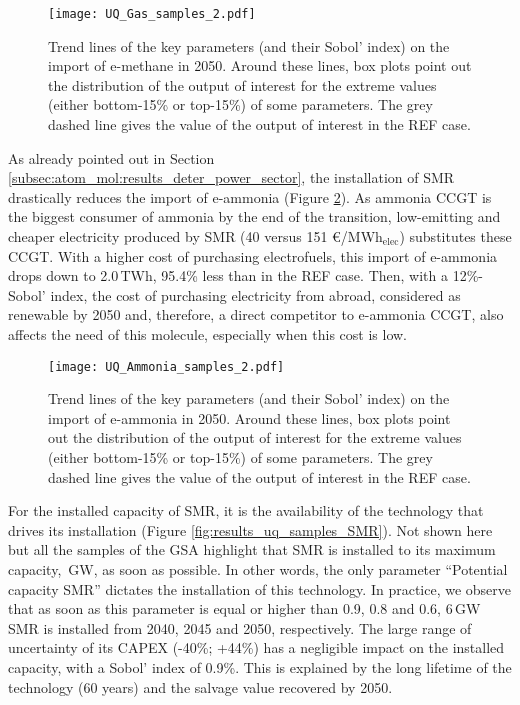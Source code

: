 \begin{figure}[htbp!]
\centering
\texttt{[image: UQ\_Gas\_samples\_2.pdf]}
\caption{Trend lines of the key parameters (and their Sobol' index) on the import of e-methane in 2050. Around these lines, box plots point out the distribution of the output of interest for the extreme values (either bottom-15\% or top-15\%) of some parameters. The grey dashed line gives the value of the output of interest in the REF case. }
\label{fig:results_uq_samples_gas}
\end{figure}

As already pointed out in Section \ref{subsec:atom_mol:results_deter_power_sector}, the installation of \gls{SMR} drastically reduces the import of e-ammonia (Figure \ref{fig:results_uq_samples_ammonia}). As ammonia \gls{CCGT} is the biggest consumer of ammonia by the end of the transition, low-emitting and cheaper electricity produced by \gls{SMR} (40 versus 151 €/MWh$_{\text{elec}}$) substitutes these \gls{CCGT}. With a higher cost of purchasing electrofuels, this import of e-ammonia drops down to 2.0\,TWh, 95.4\% less than in the REF case. Then, with a 12\%-Sobol' index, the cost of purchasing electricity from abroad, considered as renewable by 2050 and, therefore, a direct competitor to e-ammonia \gls{CCGT}, also affects the need of this molecule, especially when this cost is low.

\begin{figure}[htbp!]
\centering
\texttt{[image: UQ\_Ammonia\_samples\_2.pdf]}
\caption{Trend lines of the key parameters (and their Sobol' index) on the import of e-ammonia in 2050. Around these lines, box plots point out the distribution of the output of interest for the extreme values (either bottom-15\% or top-15\%) of some parameters. The grey dashed line gives the value of the output of interest in the REF case. }
\label{fig:results_uq_samples_ammonia}
\end{figure}

For the installed capacity of \gls{SMR}, it is the availability of the technology that drives its installation (Figure \ref{fig:results_uq_samples_SMR}). Not shown here but all the samples of the \gls{GSA} highlight that \gls{SMR} is installed to its maximum capacity, \,GW, as soon as possible. In other words, the only parameter ``Potential capacity \gls{SMR}'' dictates the installation of this technology. In practice, we observe that as soon as this parameter is equal or higher than 0.9, 0.8 and 0.6, 6\,GW \gls{SMR} is installed from 2040, 2045 and 2050, respectively. The large range of uncertainty of its CAPEX (-40\%; +44\%) has a negligible impact on the installed capacity, with a Sobol' index of 0.9\%. This is explained by the long lifetime of the technology (60 years) and the salvage value recovered by 2050.

